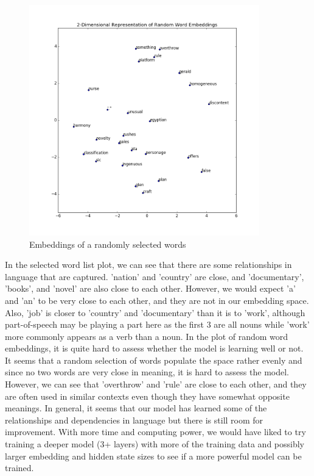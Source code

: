 \documentclass[a4paper]{article}
\begin{document}
\begin{figure}[H]
  \includegraphics[width=10cm]{../plots/gutenberg_random_word_embeddings.png}
  \centering
  \caption{Embeddings of a randomly selected words}
  \label{fig:boat1}
\end{figure}

In the selected word list plot, we can see that there are some relationships in language that are captured. 'nation' and 'country' are close, and 'documentary', 'books', and 'novel' are also close to each other. However, we would expect 'a' and 'an' to be very close to each other, and they are not in our embedding space. Also, 'job' is closer to 'country' and 'documentary' than it is to 'work', although part-of-speech may be playing a part here as the first 3 are all nouns while 'work' more commonly appears as a verb than a noun. 
\newline
\newline
In the plot of random word embeddings, it is quite hard to assess whether the model is learning well or not. It seems that a random selection of words populate the space rather evenly and since no two words are very close in meaning, it is hard to assess the model. However, we can see that 'overthrow' and 'rule' are close to each other, and they are often used in similar contexts even though they have somewhat opposite meanings.
\newline
\newline
In general, it seems that our model has learned some of the relationships and dependencies in language but there is still room for improvement. With more time and computing power, we would have liked to try training a deeper model (3+ layers) with more of the training data and possibly larger embedding and hidden state sizes to see if a more powerful model can be trained.  
\end{document}
